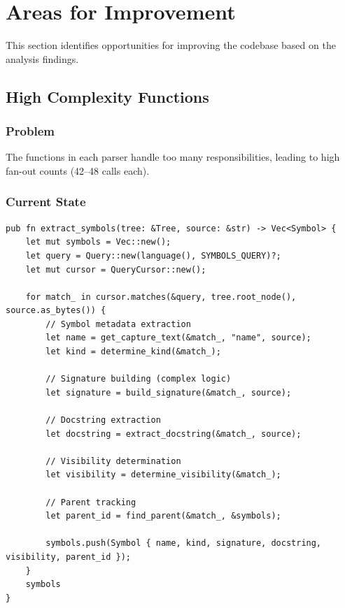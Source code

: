 
\section{Areas for Improvement}
\label{sec:improvements}

This section identifies opportunities for improving the \ctx{} codebase based on the analysis findings.

\subsection{High Complexity Functions}

\subsubsection{Problem}

The  functions in each parser handle too many responsibilities, leading to high fan-out counts (42--48 calls each).

\subsubsection{Current State}

\begin{lstlisting}[style=rustcode, caption={Current monolithic extract\_symbols (simplified)}]
pub fn extract_symbols(tree: &Tree, source: &str) -> Vec<Symbol> {
    let mut symbols = Vec::new();
    let query = Query::new(language(), SYMBOLS_QUERY)?;
    let mut cursor = QueryCursor::new();
    
    for match_ in cursor.matches(&query, tree.root_node(), source.as_bytes()) {
        // Symbol metadata extraction
        let name = get_capture_text(&match_, "name", source);
        let kind = determine_kind(&match_);
        
        // Signature building (complex logic)
        let signature = build_signature(&match_, source);
        
        // Docstring extraction
        let docstring = extract_docstring(&match_, source);
        
        // Visibility determination
        let visibility = determine_visibility(&match_);
        
        // Parent tracking
        let parent_id = find_parent(&match_, &symbols);
        
        symbols.push(Symbol { name, kind, signature, docstring, visibility, parent_id });
    }
    symbols
}
\end{lstlisting}

